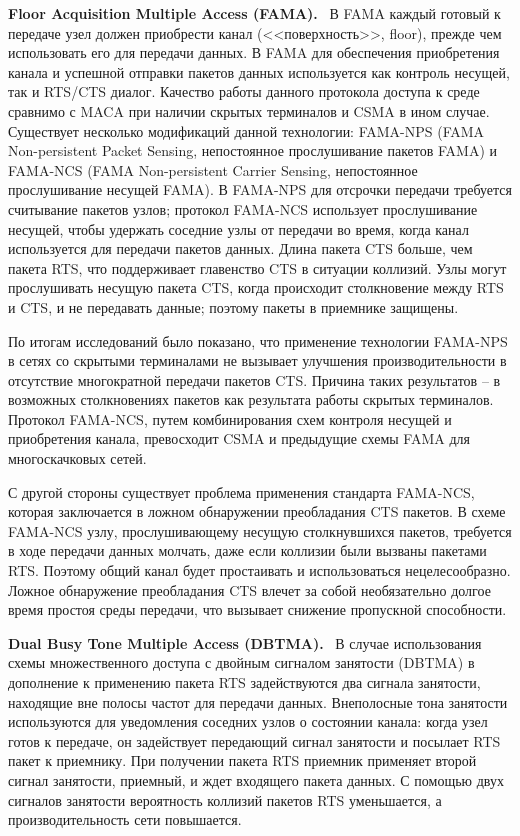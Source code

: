 \documentclass[14pt,a4paper,titlepage]{extarticle}
\renewcommand{\paragraph}[1]{\textbf{#1.}~}
\begin{document}
\paragraph{Floor Acquisition Multiple Access (FAMA)}
В FAMA каждый готовый к передаче узел должен приобрести канал (<<поверхность>>, floor), прежде чем использовать его для передачи данных. В FAMA для обеспечения приобретения канала и успешной отправки пакетов данных используется как контроль несущей, так и RTS/CTS диалог. Качество работы данного протокола доступа к среде сравнимо с MACA при наличии скрытых терминалов и CSMA в ином случае. Существует несколько модификаций данной технологии: FAMA-NPS (FAMA Non-persistent Packet Sensing, непостоянное прослушивание пакетов FAMA) и FAMA-NCS (FAMA Non-persistent Carrier Sensing, непостоянное прослушивание несущей FAMA). В FAMA-NPS для отсрочки передачи требуется считывание пакетов узлов; протокол FAMA-NCS использует прослушивание несущей, чтобы удержать соседние узлы от передачи во время, когда канал используется для передачи пакетов данных. Длина пакета CTS больше, чем пакета RTS, что поддерживает главенство CTS в ситуации коллизий. Узлы могут прослушивать несущую пакета CTS, когда происходит столкновение между RTS и CTS, и не передавать данные; поэтому пакеты в приемнике защищены.

По итогам исследований было показано, что применение технологии FAMA-NPS в сетях со скрытыми терминалами не вызывает улучшения производительности в отсутствие многократной передачи пакетов CTS. Причина таких результатов -- в возможных столкновениях пакетов как результата работы скрытых терминалов. Протокол FAMA-NCS, путем комбинирования схем контроля несущей и приобретения канала, превосходит CSMA и предыдущие схемы FAMA для многоскачковых сетей. 

С другой стороны существует проблема применения стандарта FAMA-NCS, которая заключается в ложном обнаружении преобладания CTS пакетов. В схеме FAMA-NCS узлу, прослушивающему несущую столкнувшихся пакетов, требуется в ходе передачи данных молчать, даже если коллизии были вызваны пакетами RTS. Поэтому общий канал будет простаивать и использоваться нецелесообразно. Ложное обнаружение преобладания CTS влечет за собой необязательно долгое время простоя среды передачи, что вызывает снижение пропускной способности. 

\paragraph{Dual Busy Tone Multiple Access (DBTMA)}
В случае использования схемы множественного доступа с двойным сигналом занятости (DBTMA) в дополнение к применению пакета RTS задействуются два сигнала занятости, находящие вне полосы частот для передачи данных. Внеполосные тона занятости используются для уведомления соседних узлов о состоянии канала: когда узел готов к передаче, он задействует передающий сигнал занятости и посылает RTS пакет к приемнику. При получении пакета RTS приемник применяет второй сигнал занятости, приемный, и ждет входящего пакета данных. С помощью двух сигналов занятости вероятность коллизий пакетов RTS уменьшается, а производительность сети повышается. 
\end{document}
